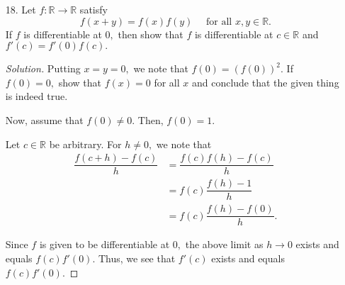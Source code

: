 \documentclass[12pt]{article}
\theoremstyle{definition}
\newenvironment{soln}{\begin{proof}[Solution]}{\end{proof}}
\begin{document}
\begin{itemize}
\begin{soln}
		Now, for $h \neq 0,$ note that
		\begin{equation*} 
			\dfrac{f(0 + h) - f(0)}{h} = h\sin\left(\dfrac{1}{h}\right).
		\end{equation*}

		As saw earlier, the limit of the above as $h \to 0$ exists and is $0.$ Thus, we get that $f$ is differentiable at $0$ as well with $f'(0) = 0.$

		Thus, $f$ is differentiable on $\mathbb{R}.$

		Now, for $x \neq 0,$ we can compute the derivative using product/chain rule. Putting this together, we get
		\begin{equation*} 
			f'(x) = \begin{cases}
				2x\sin\left(\dfrac{1}{x}\right) - \cos\left(\dfrac{1}{x}\right) & x \neq 0,\\
				0 & x = 0.
			\end{cases}
		\end{equation*}

		We now show that $f'$ is not continuous at $0.$ We use the sequential criterion for this. Consider the sequence
		\begin{equation*} 
			x_n \vcentcolon= \dfrac{1}{2n\pi}, \qquad n \in \mathbb{N}.
		\end{equation*}
		Clearly, we have that $x_n \to 0$ and $x_n \neq 0.$ Thus, we get
		\begin{equation*} 
			f'(x_n) = -\cos(2n\pi) = -1.
		\end{equation*}

		Thus, we see that $f'(x_n) \to -1 \neq f'(0).$ \\
		This shows that $f'$ is not continuous.
	\end{soln}
	\newpage
	\item[18.] Let $f:\mathbb{R}\to\mathbb{R}$ satisfy
	\begin{equation*} 
		f(x + y) = f(x)f(y) \quad \text{ for all } x, y \in \mathbb{R}.
	\end{equation*}
	If $f$ is differentiable at $0,$ then show that $f$ is differentiable at $c \in \mathbb{R}$ and $f'(c) = f'(0)f(c).$
	\begin{soln}
		Putting $x = y = 0,$ we note that $f(0) = (f(0))^2.$ If $f(0) = 0,$ show that $f(x) = 0$ for all $x$ and conclude that the given thing is indeed true.

		Now, assume that $f(0) \neq 0.$ Then, $f(0) = 1.$

		Let $c \in \mathbb{R}$ be arbitrary. For $h \neq 0,$ we note that
		\begin{align*} 
			\dfrac{f(c + h) - f(c)}{h} &= \dfrac{f(c)f(h) - f(c)}{h}\\
			&=f(c)\dfrac{f(h) - 1}{h}\\
			&=f(c)\dfrac{f(h) - f(0)}{h}.
		\end{align*}

		Since $f$ is given to be differentiable at $0,$ the above limit as $h \to 0$ exists and equals $f(c)f'(0).$ Thus, we see that $f'(c)$ exists and equals $f(c)f'(0).$
	\end{soln}
\end{itemize}
\end{document}
